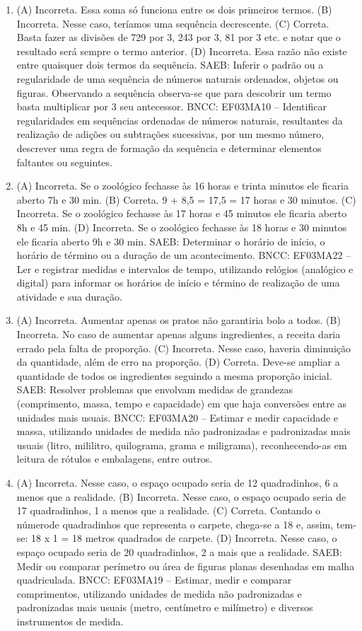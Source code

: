 \begin{enumerate}
\item
(A) Incorreta. Essa soma só funciona entre os dois primeiros termos.
(B) Incorreta. Nesse caso, teríamos uma sequência decrescente.
(C) Correta. Basta fazer as divisões de 729 por 3, 243 por 3, 81 por 3 etc. e notar que o resultado será sempre o termo anterior.
(D) Incorreta. Essa razão não existe entre quaisquer dois termos da sequência.
SAEB: Inferir o padrão ou a regularidade de uma sequência de números naturais ordenados, objetos ou figuras. Observando a sequência observa-se que para descobrir um termo basta multiplicar por 3 seu antecessor.
BNCC: EF03MA10 -- Identificar regularidades em sequências ordenadas de números naturais,
resultantes da realização de adições ou subtrações sucessivas, por um mesmo número,
descrever uma regra de formação da sequência e determinar elementos faltantes ou seguintes.

\item
(A) Incorreta. Se o zoológico fechasse às 16 horas e trinta minutos ele ficaria aberto 7h e 30 min.
(B) Correta. 9 + 8,5 = 17,5 = 17 horas e 30 minutos.
(C) Incorreta. Se o zoológico fechasse às 17 horas e 45 minutos ele ficaria aberto 8h e 45 min.
(D) Incorreta. Se o zoológico fechasse às 18 horas e 30 minutos ele ficaria aberto 9h e 30 min.
SAEB: Determinar o horário de início, o horário de término ou a duração de um acontecimento.
BNCC: EF03MA22 -- Ler e registrar medidas e intervalos de tempo, utilizando relógios (analógico e
digital) para informar os horários de início e término de realização de uma atividade e sua duração.

\item
(A) Incorreta. Aumentar apenas os pratos não garantiria bolo a todos.
(B) Incorreta. No caso de aumentar apenas alguns ingredientes, a receita daria errado pela falta de proporção.
(C) Incorreta. Nesse caso, haveria diminuição da quantidade, além de erro na proporção.
(D) Correta. Deve-se ampliar a quantidade de todos os ingredientes seguindo a mesma proporção inicial.
SAEB: Resolver problemas que envolvam medidas de grandezas (comprimento, massa, tempo e capacidade) em que haja conversões entre as
unidades mais usuais.
BNCC: EF03MA20 -- Estimar e medir capacidade e massa, utilizando unidades de medida não
padronizadas e padronizadas mais usuais (litro, mililitro, quilograma, grama e miligrama),
reconhecendo-as em leitura de rótulos e embalagens, entre outros.

\item
(A) Incorreta. Nesse caso, o espaço ocupado seria de 12 quadradinhos, 6 a menos que a realidade.
(B) Incorreta. Nesse caso, o espaço ocupado seria de 17 quadradinhos, 1 a menos que a realidade.
(C) Correta. Contando o númerode quadradinhos que representa o carpete, chega-se a 18 e,
assim, tem-se: 18 x 1 = 18 metros quadrados de carpete.
(D) Incorreta. Nesse caso, o espaço ocupado seria de 20 quadradinhos, 2 a mais que a realidade.
SAEB: Medir ou comparar perímetro ou área de figuras planas desenhadas em malha quadriculada.
BNCC: EF03MA19 -- Estimar, medir e comparar comprimentos, utilizando unidades de medida
não padronizadas e padronizadas mais usuais (metro, centímetro e milímetro) e diversos
instrumentos de medida.


\end{enumerate}
